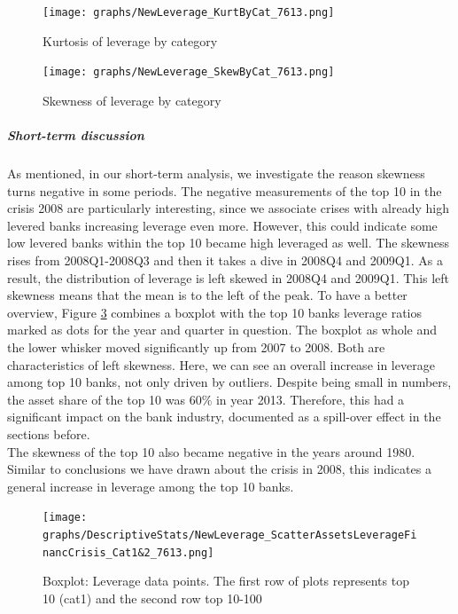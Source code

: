 \documentclass[12pt, a4paper]{article} %
\begin{document}
\begin{figure}[H]
\begin{minipage}{\textwidth}
\centering
\texttt{[image: graphs/NewLeverage\_KurtByCat\_7613.png]}
\caption[1]{Kurtosis of leverage by category}
\label{fig:averageLeverage_kurt_Categories}
\end{minipage}
\end{figure}

\begin{figure}[H]
\begin{minipage}{\textwidth}
\centering
\texttt{[image: graphs/NewLeverage\_SkewByCat\_7613.png]}
\caption[1]{Skewness of leverage by category}
\label{fig:averageLeverage_skew_Categories}
\end{minipage}
\end{figure} 

\subparagraph{Short-term discussion} 

As mentioned, in our short-term analysis, we investigate the reason skewness turns negative in some periods. The negative measurements of the top 10 in the crisis 2008 are particularly interesting, since we associate crises with already high levered banks increasing leverage even more. However, this could indicate some low levered banks within the top 10 became high leveraged as well.
The skewness rises from 2008Q1-2008Q3 and then it takes a dive in 2008Q4 and 2009Q1. As a result, the distribution of leverage is left skewed in 2008Q4 and 2009Q1. This left skewness means that the mean is to the left of the peak. To have a better overview, Figure \ref{fig:BoxplotLeverageDatapointsFinancCrisis} combines a boxplot with the top 10 banks leverage ratios marked as dots for the year and quarter in question. The boxplot as whole and the lower whisker moved significantly up from 2007 to 2008. Both are characteristics of left skewness. Here, we can see an overall increase in leverage among top 10 banks, not only driven by outliers. Despite being small in numbers, the asset share of the top 10 was $60\%$ in year 2013. Therefore, this had a significant impact on the bank industry, documented as a spill-over effect in the sections before.\\
The skewness of the top 10 also became negative in the years around 1980. Similar to conclusions we have drawn about the crisis in 2008, this indicates a general increase in leverage among the top 10 banks.  


\begin{figure}[H]
\begin{minipage}{\textwidth}
\centering
\texttt{[image: graphs/DescriptiveStats/NewLeverage\_ScatterAssetsLeverageFinancCrisis\_Cat1\&2\_7613.png]}
\caption[1]{Boxplot: Leverage data points. The first row of plots represents top 10 (cat1) and the second row top 10-100}
\label{fig:BoxplotLeverageDatapointsFinancCrisis}
\end{minipage}
\end{figure}
\end{document}
